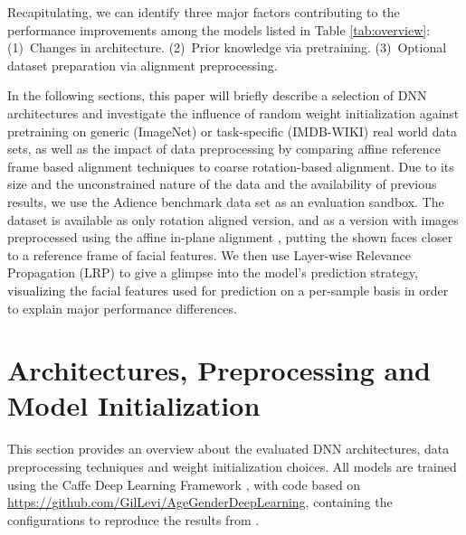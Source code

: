 \documentclass[10pt,twocolumn,letterpaper]{article}
\begin{document}
Recapitulating, we can identify three major factors contributing to the performance improvements among the models listed in Table \ref{tab:overview}: (1)~Changes in architecture. (2)~Prior knowledge via pretraining. (3)~Optional dataset preparation via alignment preprocessing.

In the following sections, this paper will briefly describe a selection of DNN architectures and investigate the influence of random weight initialization against pretraining on generic  (ImageNet) or task-specific (IMDB-WIKI) real world data sets, as well as the impact of data preprocessing by comparing affine reference frame based alignment techniques to coarse rotation-based alignment. Due to its size and the unconstrained nature of the data and the availability of previous results, we use the Adience benchmark data set as an evaluation sandbox. The dataset is available as only rotation aligned version, and as a version with images preprocessed using the affine in-plane alignment \cite{eidinger2014age}, putting the shown faces closer to a reference frame of facial features. We then use Layer-wise Relevance Propagation (LRP) \cite{bach2015pixel} to give a glimpse into the model's prediction strategy, visualizing the facial features used for prediction on a per-sample basis in order to explain major performance differences.

\section{Architectures, Preprocessing and Model Initialization}
\label{sec:modelarchitectures}

This section provides an overview about the evaluated DNN architectures, data preprocessing techniques and weight initialization choices. All models are trained using the Caffe Deep Learning Framework \cite{jia2014caffe},
with code based on \url{https://github.com/GilLevi/AgeGenderDeepLearning},
containing the configurations to reproduce the results from  \cite{levi2015age}.
\end{document}
